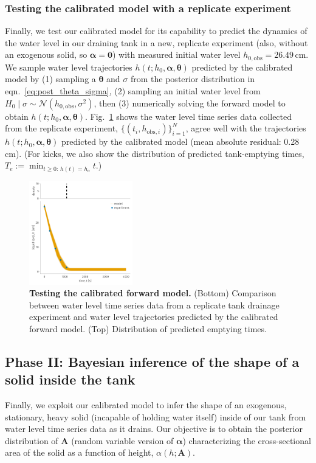 \documentclass[a4paper,fleqn]{cas-dc}
\newcommand\thedata {$\{(t_i,h_{\text{obs}, i})\}_{i=1}^{N}$\xspace}
\newcommand\themodel {$h(t; h_0, \boldsymbol \alpha, \boldsymbol\theta)$\xspace}
\begin{document}
\subsubsection{Testing the calibrated model with a replicate experiment}
Finally, we test our calibrated model for its capability to predict the dynamics of the water level in our draining tank in a new, replicate experiment (also, without an exogenous solid, so $\boldsymbol \alpha=\mathbf{0}$) with measured initial water level $h_{0, \text{obs}}=26.49$\,cm. 
We sample water level trajectories \themodel predicted by the calibrated model by (1) sampling a $\boldsymbol \theta$ and $\sigma$ from the posterior distribution in eqn.~\ref{eq:post_theta_sigma}, (2) sampling an initial water level from $H_0 \mid \sigma \sim \mathcal{N}(h_{0, \text{obs}}, \sigma^2)$, then (3) numerically solving the forward model to obtain \themodel.
Fig.~\ref{fig:test} shows the water level time series data collected from the replicate experiment, \thedata, agree well with the trajectories \themodel predicted by the calibrated model (mean absolute residual: 0.28\,cm). 
(For kicks, we also show the distribution of predicted tank-emptying times, $T_e := \min_{t \geq 0 :\, h(t)=h_o} t$.)

\begin{figure}[h!]
    \centering
    	\includegraphics[width=0.4\textwidth]{test.pdf}
    \caption{
      \textbf{Testing the calibrated forward model.}
      (Bottom) Comparison between water level time series data from a replicate tank drainage experiment and water level trajectories predicted by the calibrated forward model. 
      (Top) Distribution of predicted emptying times.
      } \label{fig:test}
\end{figure}

\subsection{Phase II: Bayesian inference of the shape of a solid inside the tank} \label{sec:phaseII}
Finally, we exploit our calibrated model to infer the shape of an exogenous, stationary, heavy solid (incapable of holding water itself) inside of our tank from water level time series data as it drains.
Our objective is to obtain the posterior distribution of $\mathbf{A}$ (random variable version of $\boldsymbol \alpha$) characterizing the cross-sectional area of the solid as a function of height, $\alpha(h; \mathbf{A})$.
\end{document}
